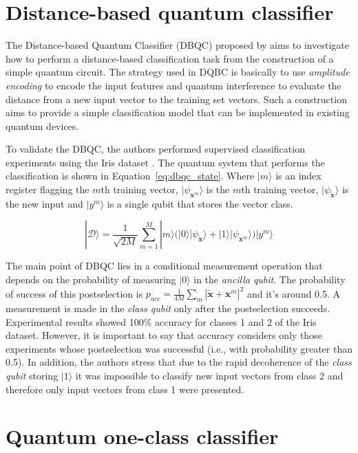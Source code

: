 \documentclass{esannV2}
\begin{document}
\section{Distance-based quantum classifier}

The Distance-based Quantum Classifier (DBQC) proposed by \cite{schuld2017implementing} aims to investigate how to perform a distance-based classification task from the construction of a simple quantum circuit. The strategy used in DQBC is basically to use \textit{amplitude encoding} to encode the input features and quantum interference to evaluate the distance from a new input vector to the training set vectors. Such a construction aims to provide a simple classification model that can be implemented in existing quantum devices.

To validate the DBQC, the authors performed supervised classification experiments using the Iris dataset \cite{fisher1936use}. The quantum system that performs the classification is shown in Equation~\ref{eq:dbqc_state}. Where $|m\rangle$ is an index register flagging the $m$th training vector, $|\psi_{\mathbf{x}^m}\rangle$ is the $m$th training vector, $|\psi_{\tilde{\mathbf{x}}}\rangle$ is the new input and $|y^m\rangle$ is a single qubit that stores the vector class.

\begin{equation}
|\mathcal{D}\rangle = \frac{1}{\sqrt{2 M}} \sum_{m=1}^M |m\rangle \Big( |0\rangle |\psi_{\tilde{\mathbf{x}}}\rangle + |1\rangle |\psi_{\mathbf{x}^m}\rangle \Big) |y^m\rangle
\label{eq:dbqc_state}
\end{equation}

The main point of DBQC lies in a conditional measurement operation that depends on the probability of measuring $|0\rangle$ in the \textit{ancilla qubit}. The probability of success of this postselection is $p_{acc}=\frac{1}{4M}\sum_m|\tilde{\mathbf{x}} + \mathbf{x}^{m}|^2$ and it's around 0.5. A measurement is made in the \textit{class qubit} only after the postselection succeeds. Experimental results showed 100\% accuracy for classes 1 and 2 of the Iris dataset. However, it is important to say that accuracy considers only those experiments whose postselection was successful (i.e., with probability greater than 0.5). In addition, the authors stress that due to the rapid decoherence of the \textit{class qubit} storing $|1\rangle$ it was impossible to classify new input vectors from class 2 and therefore only input vectors from class 1 were presented.

\section{Quantum one-class classifier}
\end{document}
